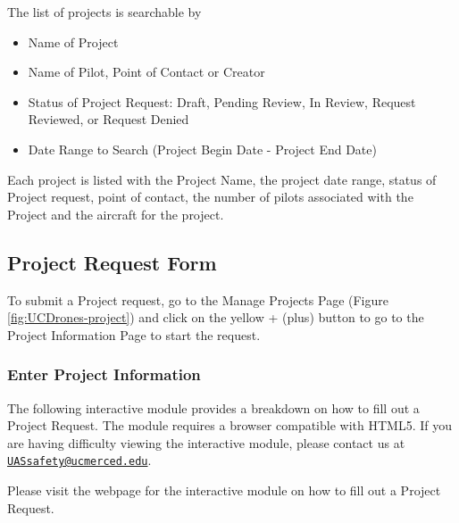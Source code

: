 \documentclass[
  12pt,
]{book}
\providecommand{\tightlist}{%
  \setlength{\itemsep}{0pt}\setlength{\parskip}{0pt}}
\begin{document}
The list of projects is searchable by

\begin{itemize}
\tightlist
\item
  Name of Project
\item
  Name of Pilot, Point of Contact or Creator
\item
  Status of Project Request: Draft, Pending Review, In Review, Request Reviewed, or Request Denied
\item
  Date Range to Search (Project Begin Date - Project End Date)
\end{itemize}

Each project is listed with the Project Name, the project date range, status of Project request, point of contact, the number of pilots associated with the Project and the aircraft for the project.

\hypertarget{project-request-form}{%
\subsection{Project Request Form}\label{project-request-form}}

To submit a Project request, go to the Manage Projects Page (Figure \ref{fig:UCDrones-project}) and click on the yellow + (plus) button to go to the Project Information Page to start the request.

\hypertarget{enter-project-information}{%
\subsubsection{Enter Project Information}\label{enter-project-information}}

The following interactive module provides a breakdown on how to fill out a Project Request. The module requires a browser compatible with HTML5. If you are having difficulty viewing the interactive module, please contact us at \href{mailto:UASsafety@ucmerced.edu}{\nolinkurl{UASsafety@ucmerced.edu}}.

Please visit the webpage for the interactive module on how to fill out a Project Request.
\end{document}
